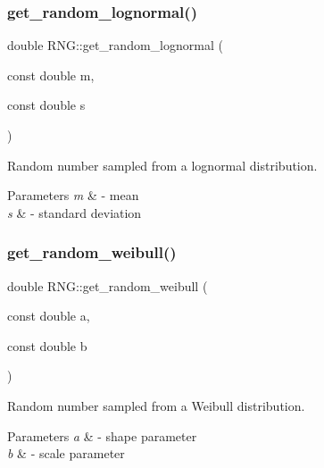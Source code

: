 \subsubsection{\texorpdfstring{get\+\_\+random\+\_\+lognormal()}{get\_random\_lognormal()}}
{\footnotesize\ttfamily double R\+N\+G\+::get\+\_\+random\+\_\+lognormal (\begin{DoxyParamCaption}\item[{const double}]{m,  }\item[{const double}]{s }\end{DoxyParamCaption})\hspace{0.3cm}{\ttfamily [inline]}}



Random number sampled from a lognormal distribution. 


\begin{DoxyParams}{Parameters}
{\em m} & -\/ mean \\
\hline
{\em s} & -\/ standard deviation \\
\hline
\end{DoxyParams}
\mbox{\label{classRNG_ae7be35e443ee86c915b32fdfc2595187}} 
\subsubsection{\texorpdfstring{get\+\_\+random\+\_\+weibull()}{get\_random\_weibull()}}
{\footnotesize\ttfamily double R\+N\+G\+::get\+\_\+random\+\_\+weibull (\begin{DoxyParamCaption}\item[{const double}]{a,  }\item[{const double}]{b }\end{DoxyParamCaption})\hspace{0.3cm}{\ttfamily [inline]}}



Random number sampled from a Weibull distribution. 


\begin{DoxyParams}{Parameters}
{\em a} & -\/ shape parameter \\
\hline
{\em b} & -\/ scale parameter \\
\hline
\end{DoxyParams}
\mbox{\label{classRNG_ad1fb3455e12c12637e74c9673984496d}} 
